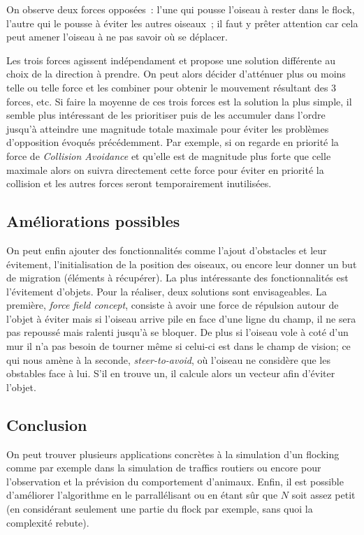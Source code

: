 \documentclass{article}
\begin{document}
On observe deux forces opposées~: l'une qui pousse l'oiseau à rester dans le flock, l'autre qui le pousse à éviter les autres oiseaux~; il faut y prêter attention car cela peut amener l'oiseau à ne pas savoir où se déplacer.

Les trois forces agissent indépendament et propose une solution différente au choix de la direction à prendre. On peut alors décider d'atténuer plus ou moins telle ou telle force et les combiner pour obtenir le mouvement résultant des 3 forces, etc. Si faire la moyenne de ces trois forces est la solution la plus simple, il semble plus intéressant de les prioritiser puis de les accumuler dans l'ordre jusqu'à atteindre une magnitude totale maximale pour éviter les problèmes d'opposition évoqués précédemment. Par exemple, si on regarde en priorité la force de \emph{Collision Avoidance} et qu'elle est de magnitude plus forte que celle maximale alors on suivra directement cette force pour éviter en priorité la collision et les autres forces seront temporairement inutilisées.

\subsection{Améliorations possibles}
On peut enfin ajouter des fonctionnalités comme l'ajout d'obstacles et leur évitement, l'initialisation de la position des oiseaux, ou encore leur donner un but de migration (éléments à récupérer). La plus intéressante des fonctionnalités est l'évitement d'objets. Pour la réaliser, deux solutions sont envisageables. La première, \emph{force field concept}, consiste à avoir une force de répulsion autour de l'objet à éviter mais si l'oiseau arrive pile en face d'une ligne du champ, il ne sera pas repoussé mais ralenti jusqu'à se bloquer. De plus si l'oiseau vole à coté d'un mur il n'a pas besoin de tourner même si celui-ci est dans le champ de vision; ce qui nous amène à la seconde, \emph{steer-to-avoid}, où l'oiseau ne considère que les obstables face à lui. S'il en trouve un, il calcule alors un vecteur afin d'éviter l'objet.

\subsection{Conclusion}
On peut trouver plusieurs applications concrètes à la simulation d'un flocking comme par exemple dans la simulation de traffics routiers ou encore pour l'observation et la prévision du comportement d'animaux.
Enfin, il est possible d'améliorer l'algorithme en le parrallélisant ou en étant sûr que $N$ soit assez petit (en considérant seulement une partie du flock par exemple, sans quoi la complexité rebute).
\end{document}
